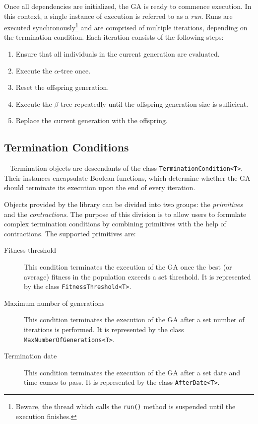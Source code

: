Once all dependencies are initialized, the GA is ready to commence execution. In this context, a single instance of execution is referred to as a \textit{run}. Runs are executed synchronously\footnote{Beware, the thread which calls the \texttt{run()} method is suspended until the execution finishes.} and are comprised of multiple iterations, depending on the termination condition. Each iteration consists of the following steps:
~
\begin{enumerate}
	\item Ensure that all individuals in the current generation are evaluated.
	\item Execute the $\alpha$-tree once.
	\item Reset the offspring generation.
	\item Execute the $\beta$-tree repeatedly until the offspring generation size is sufficient.
	\item Replace the current generation with the offspring.
\end{enumerate}

\subsection{Termination Conditions}~\label{section:termination-conditions}
Termination objects are descendants of the class \texttt{TerminationCondition<T>}. Their instances encapsulate Boolean functions, which determine whether the GA should terminate its execution upon the end of every iteration.

Objects provided by the library can be divided into two groups: the \textit{primitives} and the \textit{contractions}. The purpose of this division is to allow users to formulate complex termination conditions by combining primitives with the help of contractions. The supported primitives are:
~
\begin{description}
	\item[Fitness threshold]
	This condition terminates the execution of the GA once the best (or average) fitness in the population exceeds a set threshold. It is represented by the class \texttt{FitnessThreshold<T>}.

	\item[Maximum number of generations]
	This condition terminates the execution of the GA after a set number of iterations is performed. It is represented by the class \texttt{MaxNumberOfGenerations<T>}.

	\item[Termination date]
	This condition terminates the execution of the GA after a set date and time comes to pass. It is represented by the class \texttt{AfterDate<T>}.
\end{description}

